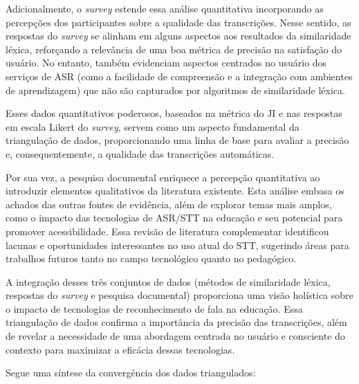 Adicionalmente, o \textit{survey} estende essa análise quantitativa incorporando as percepções dos participantes sobre a qualidade das transcrições. Nesse sentido, as respostas do \textit{survey} se alinham em alguns aspectos aos resultados da similaridade léxica, reforçando a relevância de uma boa métrica de precisão na satisfação do usuário. No entanto, também evidenciam aspectos centrados no usuário dos serviços de ASR (como a facilidade de compreensão e a integração com ambientes de aprendizagem) que não são capturados por algoritmos de similaridade léxica.

Esses dados quantitativos poderosos, baseados na métrica do JI e nas respostas em escala Likert do \textit{survey}, servem como um aspecto fundamental da triangulação de dados, proporcionando uma linha de base para avaliar a precisão e, consequentemente, a qualidade das transcrições automáticas.

Por sua vez, a pesquisa documental enriquece a percepção quantitativa ao introduzir elementos qualitativos da literatura existente. Esta análise embasa os achados das outras fontes de evidência, além de explorar temas mais amplos, como o impacto das tecnologias de ASR/STT na educação e seu potencial para promover acessibilidade. Essa revisão de literatura complementar identificou lacunas e oportunidades interessantes no uso atual do STT, sugerindo áreas para trabalhos futuros tanto no campo tecnológico quanto no pedagógico.

A integração desses três conjuntos de dados (métodos de similaridade léxica, respostas do \textit{survey} e pesquisa documental) proporciona uma visão holística sobre o impacto de tecnologias de reconhecimento de fala na educação. Essa triangulação de dados confirma a importância da precisão das transcrições, além de revelar a necessidade de uma abordagem centrada no usuário e consciente do contexto para maximizar a eficácia dessas tecnologias. 

Segue uma síntese da convergência dos dados triangulados:

